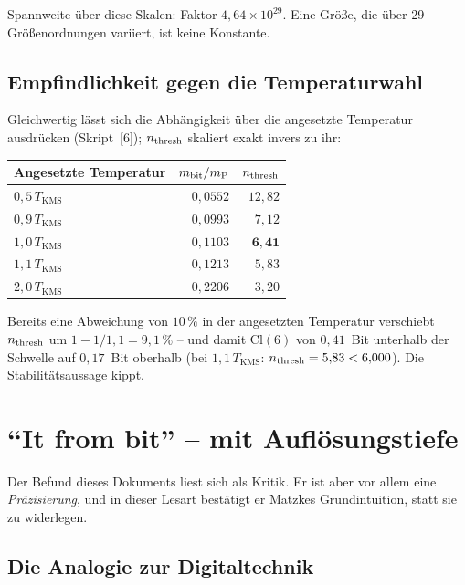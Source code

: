 Spannweite über diese Skalen: Faktor $4{,}64\times10^{29}$.
Eine Größe, die über 29 Größenordnungen variiert, ist keine Konstante. \B

\subsection{Empfindlichkeit gegen die Temperaturwahl}

Gleichwertig lässt sich die Abhängigkeit über die angesetzte Temperatur
ausdrücken (Skript~[6]); $n_{\mathrm{thresh}}$ skaliert exakt invers zu ihr:

\begin{center}
\small
\begin{tabular}{@{}lrr@{}}
  \toprule
  Angesetzte Temperatur & $m_{\mathrm{bit}}/m_{\mathrm{P}}$ & $n_{\mathrm{thresh}}$ \\
  \midrule
  $0{,}5\,T_{\mathrm{KMS}}$ & $0{,}0552$ & $12{,}82$ \\
  $0{,}9\,T_{\mathrm{KMS}}$ & $0{,}0993$ & $7{,}12$ \\
  $1{,}0\,T_{\mathrm{KMS}}$ & $0{,}1103$ & $\mathbf{6{,}41}$ \\
  $1{,}1\,T_{\mathrm{KMS}}$ & $0{,}1213$ & $5{,}83$ \\
  $2{,}0\,T_{\mathrm{KMS}}$ & $0{,}2206$ & $3{,}20$ \\
  \bottomrule
\end{tabular}
\end{center}

Bereits eine Abweichung von $10\,\%$ in der angesetzten Temperatur
verschiebt $n_{\mathrm{thresh}}$ um $1 - 1/1{,}1 = 9{,}1\,\%$ -- und damit $\mathrm{Cl}(6)$ von
$0{,}41$~Bit unterhalb der Schwelle auf $0{,}17$~Bit oberhalb
(bei $1{,}1\,T_{\mathrm{KMS}}$: $n_{\mathrm{thresh}} = 5{,}83 < 6{,}000$).
Die Stabilitätsaussage kippt.

\section{\enquote{It from bit} -- mit Auflösungstiefe}

Der Befund dieses Dokuments liest sich als Kritik. Er ist aber vor allem
eine \emph{Präzisierung}, und in dieser Lesart bestätigt er Matzkes
Grundintuition, statt sie zu widerlegen.

\subsection{Die Analogie zur Digitaltechnik}

